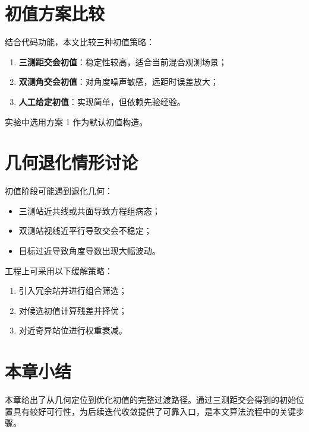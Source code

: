 \section{初值方案比较}
结合代码功能，本文比较三种初值策略：
\begin{enumerate}
  \item \textbf{三测距交会初值}：稳定性较高，适合当前混合观测场景；
  \item \textbf{双测角交会初值}：对角度噪声敏感，远距时误差放大；
  \item \textbf{人工给定初值}：实现简单，但依赖先验经验。
\end{enumerate}
实验中选用方案 1 作为默认初值构造。

\section{几何退化情形讨论}
初值阶段可能遇到退化几何：
\begin{itemize}
  \item 三测站近共线或共面导致方程组病态；
  \item 双测站视线近平行导致交会不稳定；
  \item 目标过近导致角度导数出现大幅波动。
\end{itemize}
工程上可采用以下缓解策略：
\begin{enumerate}
  \item 引入冗余站并进行组合筛选；
  \item 对候选初值计算残差并择优；
  \item 对近奇异站位进行权重衰减。
\end{enumerate}

\section{本章小结}
本章给出了从几何定位到优化初值的完整过渡路径。通过三测距交会得到的初始位置具有较好可行性，为后续迭代收敛提供了可靠入口，是本文算法流程中的关键步骤。
